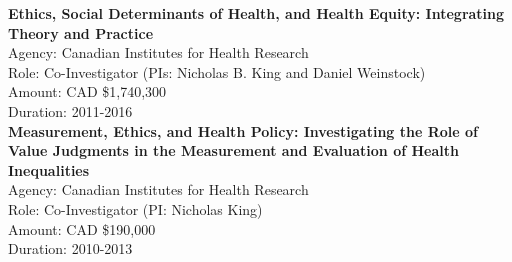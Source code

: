 \documentclass[
  letterpaper,
  DIV=11,
  numbers=noendperiod]{scrartcl}
\begin{document}
\textbf{Ethics, Social Determinants of Health, and Health Equity:
Integrating Theory and Practice}\\
\hspace*{0.333em}\hspace*{0.333em}\hspace*{0.333em}\hspace*{0.333em}Agency:
Canadian Institutes for Health Research\\
\hspace*{0.333em}\hspace*{0.333em}\hspace*{0.333em}\hspace*{0.333em}Role:
Co-Investigator (PIs: Nicholas B. King and Daniel Weinstock)\\
\hspace*{0.333em}\hspace*{0.333em}\hspace*{0.333em}\hspace*{0.333em}Amount:
CAD \$1,740,300\\
\hspace*{0.333em}\hspace*{0.333em}\hspace*{0.333em}\hspace*{0.333em}Duration:
2011-2016\\

\textbf{Measurement, Ethics, and Health Policy: Investigating the Role
of Value Judgments in the Measurement and Evaluation of Health
Inequalities}\\
\hspace*{0.333em}\hspace*{0.333em}\hspace*{0.333em}\hspace*{0.333em}Agency:
Canadian Institutes for Health Research\\
\hspace*{0.333em}\hspace*{0.333em}\hspace*{0.333em}\hspace*{0.333em}Role:
Co-Investigator (PI: Nicholas King)\\
\hspace*{0.333em}\hspace*{0.333em}\hspace*{0.333em}\hspace*{0.333em}Amount:
CAD \$190,000\\
\hspace*{0.333em}\hspace*{0.333em}\hspace*{0.333em}\hspace*{0.333em}Duration:
2010-2013\\
\end{document}
